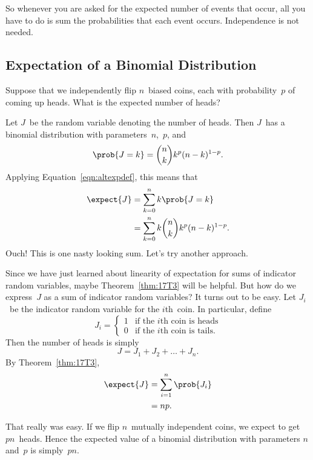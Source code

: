 So whenever you are asked for the expected number of events that occur,
all you have to do is sum the probabilities that each event occurs.
Independence is not needed.

\subsection{Expectation of a Binomial Distribution}

Suppose that we independently flip $n$~biased coins, each with
probability~$p$ of coming up heads.  What is the expected number of
heads?

Let $J$~be the random variable denoting the number of heads.  Then
$J$~has a binomial distribution with parameters~$n$,~$p$, and
\begin{equation*}
    \prob{J = k} = \binom{n}{k} k^p (n - k)^{1 - p}.
\end{equation*}
Applying Equation~\ref{eqn:altexpdef}, this means that
\begin{align}
\expect{J}
    &= \sum_{k = 0}^n k \prob{J = k} \notag\\
    &= \sum_{k = 0}^n k \binom{n}{k} k^p (n - k)^{1 - p}. \label{eqn:17T7}
\end{align}
Ouch!  This is one nasty looking sum.  Let's try another approach.

Since we have just learned about linearity of expectation for sums of
indicator random variables, maybe Theorem~\ref{thm:17T3} will be
helpful.  But how do we express~$J$ as a sum of indicator random
variables?  It turns out to be easy.  Let $J_i$~be the indicator
random variable for the $i$th~coin.  In particular, define
\begin{equation*}
J_i = \begin{cases}
        1 & \text{if the $i$th coin is heads} \\
        0 & \text{if the $i$th coin is tails}.
      \end{cases}
\end{equation*}
Then the number of heads is simply
\begin{equation*}
    J = J_1 + J_2 + \dots + J_n.
\end{equation*}
By Theorem~\ref{thm:17T3},
\begin{align}
\expect{J}
    &= \sum_{i = 1}^n \prob{J_i} \notag\\
    &= np. \label{eqn:17T8}
\end{align}

That really was easy.  If we flip $n$~mutually independent coins, we
expect to get $pn$~heads.  Hence the expected value of a binomial
distribution with parameters $n$ and~$p$ is simply~$pn$.

